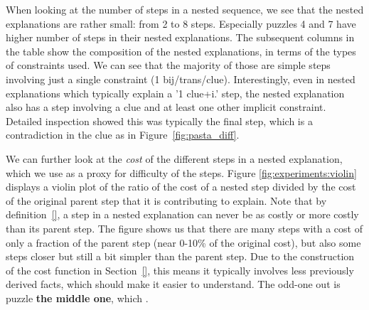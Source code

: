 
When looking at the number of steps in a nested sequence, we see that the nested explanations are rather small: from 2 to 8 steps. Especially puzzles 4 and 7 have higher number of steps in their nested explanations.
The subsequent columns in the table show the composition of the nested explanations, in terms of the types of constraints used. We can see that the majority of those are simple steps involving just a single constraint (1 bij/trans/clue). Interestingly, even in nested explanations which typically explain a '1 clue+i.' step, the nested explanation also has a step involving a clue and at least one other implicit constraint. Detailed inspection showed this was typically the final step, which is a contradiction in the clue as in Figure~\ref{fig:pasta_diff}.


We can further look at the \textit{cost} of the different steps in a nested explanation, which we use as a proxy for difficulty of the steps. Figure \ref{fig:experiments:violin} displays a violin plot of the ratio of the cost of a nested step divided by the cost of the original parent step that it is contributing to explain. Note that by definition~\ref{}, a step in a nested explanation can never be as costly or more costly than its parent step.
The figure shows us that there are many steps with a cost of only a fraction of the parent step (near 0-10\% of the original cost), but also some steps closer but still a bit simpler than the parent step. Due to the construction of the cost function in Section~\ref{}, this means it typically involves less previously derived facts, which should make it easier to understand. The odd-one out is puzzle \textbf{the middle one}, which .

